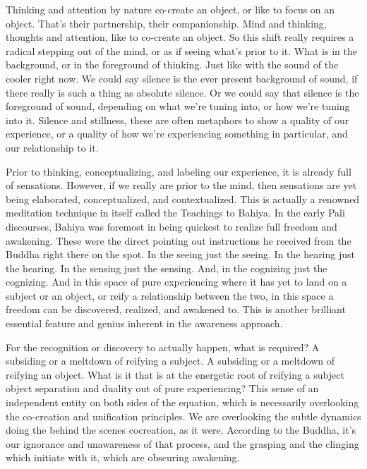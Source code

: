 \documentclass[12pt,openany]{book}
\begin{document}
Thinking and attention by nature co-create an object, or like to focus on an object. That's their partnership, their companionship. Mind and thinking, thoughts and attention, like to co-create an object. So this shift really requires a radical stepping out of the mind, or as if seeing what’s prior to it. What is in the background, or in the foreground of thinking. Just like with the sound of the cooler right now. We could say silence is the ever present background of sound, if there really is such a thing as absolute silence. Or we could say that silence is the foreground of sound, depending on what we're tuning into, or how we're tuning into it. Silence and stillness, these are often metaphors to show a quality of our experience, or a quality of how we're experiencing something in particular, and our relationship to it.

Prior to thinking, conceptualizing, and labeling our experience, it is already full of sensations. However, if we really are prior to the mind, then sensations are yet being elaborated, conceptualized, and contextualized. This is actually a renowned meditation technique in itself called the Teachings to Bahiya. In the early Pali discourses, Bahiya was foremost in being quickest to realize full freedom and awakening. These were the direct pointing out instructions he received from the Buddha right there on the spot. In the seeing just the seeing. In the hearing just the hearing. In the sensing just the sensing. And, in the cognizing just the cognizing. And in this space of pure experiencing where it has yet to land on a subject or an object, or reify a relationship between the two, in this space a freedom can be discovered, realized, and awakened to. This is another brilliant essential feature and genius inherent in the awareness approach.

For the recognition or discovery to actually happen, what is required? A subsiding or a meltdown of reifying a subject. A subsiding or a meltdown of reifying an object. What is it that is at the energetic root of reifying a subject object separation and duality out of pure experiencing? This sense of an independent entity on both sides of the equation, which is necessarily overlooking the co-creation and unification principles. We are overlooking the subtle dynamics doing the behind the scenes cocreation, as it were. According to the Buddha, it’s our ignorance and unawareness of that process, and the grasping and the clinging \linebreak which initiate with it, which are obscuring awakening.
\end{document}
